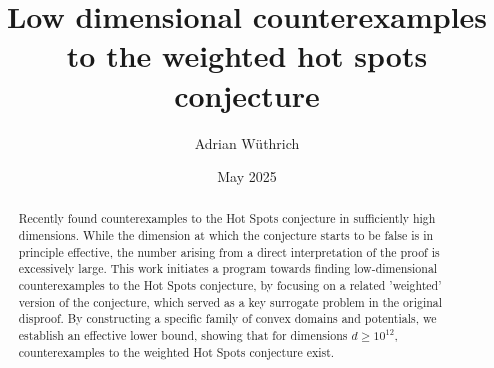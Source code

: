 \documentclass{article}
\title{Low dimensional counterexamples to the weighted hot spots conjecture}
\author{Adrian Wüthrich}
\date{May 2025}
\begin{document}
\newcommand{\R}{\mathbb{R}}
\newcommand{\E}{\mathbb{E}}
\newcommand{\inner}[2]{\langle #1, #2 \rangle}


\newcommand{\dimension}{10^{12}}
\newcommand{\eiglowerdelta}{0.03}
\newcommand{\tzero}{50}
\newcommand{\normphizero}{2.5}



\maketitle

\begin{abstract}
    Recently \cite{pont_convex_2024} found counterexamples to the Hot Spots conjecture in sufficiently high dimensions. While the dimension at which the conjecture starts to be false is in principle effective, the number arising from a direct interpretation of the proof is excessively large.  This work initiates a program towards finding low-dimensional counterexamples to the Hot Spots conjecture, by focusing on a related 'weighted' version of the conjecture, which served as a key surrogate problem in the original disproof. By constructing a specific family of convex domains and potentials, we establish an effective lower bound, showing that for dimensions $d \ge \dimension$, counterexamples to the weighted Hot Spots conjecture exist.
\end{abstract}
















\newpage 

\appendix


%



\end{document}
